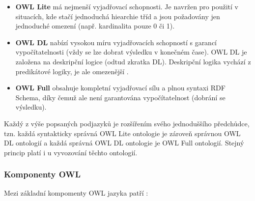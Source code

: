             \begin{itemize}
            \item \textbf{OWL Lite} má nejmenší vyjadřovací schopnosti. 
            Je navržen pro použití v situacích, kde stačí jednoduchá hiearchie tříd a jsou požadovány jen jednoduché omezení (např. kardinalita pouze 0 či 1).
            
            \item \textbf{OWL DL} nabízí vysokou míru vyjadřovacích schopností s garancí vypočítatelnosti (vždy se lze dobrat výsledku v konečném čase). 
            OWL DL je založena na deskripční logice (odtud zkratka DL). 
            Deskripční logika vychází z predikátové logiky, je ale omezenější \cite{svatek}.
            
            \item \textbf{OWL Full} obsahuje kompletní vyjadřovací sílu a plnou syntaxi RDF Schema, díky čemuž ale není garantována vypočítatelnost (dobrání se výsledku). 
            \end{itemize}
            
            Každý z výše popsaných podjazyků je rozšířením svého jednoduššího předchůdce, tzn. každá syntakticky správná OWL Lite ontologie je zároveň správnou OWL DL ontologií a každá správná OWL DL ontologie je OWL Full ontologií.
            Stejný princip platí i u vyvozování těchto ontologií.
            
        \subsubsection{Komponenty OWL}
            
            Mezi základní kompomenty OWL jazyka patří \cite{owltutorial}:
            
